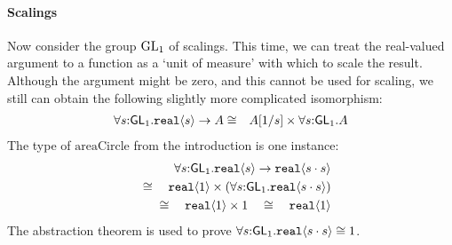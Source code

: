 \paragraph{Scalings}
Now consider the group $\mathrm{GL}_1$ of scalings. This time, we can treat
the real-valued argument to a function as a `unit of measure' with
which to scale the result. 
Although the argument might be zero, and this cannot be used for scaling,
we still can obtain the following slightly more complicated
isomorphism:
\begin{eqnarray*}
\forall s\mathord:\mathsf{GL}_1.\textup{\texttt{real}}\langle s \rangle\to A
& \cong &
A[1/s]\times \forall s\mathord:\mathsf{GL}_1.A
\end{eqnarray*}
The type of $\mathrm{areaCircle}$ from the introduction is one instance:
\begin{eqnarray*}
\forall s\mathord:\mathsf{GL}_1.\textup{\texttt{real}}\langle s \rangle\to\textup{\texttt{real}}\langle s\cdot
  s \rangle\\ \quad\cong\quad \textup{\texttt{real}}\langle 1 \rangle\times(\forall
s\mathord:\mathsf{GL}_1.\textup{\texttt{real}}\langle s\cdot s \rangle)\\ \quad\cong\quad
\textup{\texttt{real}}\langle 1 \rangle\times 1\quad\cong\quad \textup{\texttt{real}}\langle 1 \rangle
\end{eqnarray*}
The abstraction theorem is used to prove
$\forall s\mathord:\mathsf{GL}_1.\textup{\texttt{real}}\langle s\cdot s \rangle\cong 1$.



